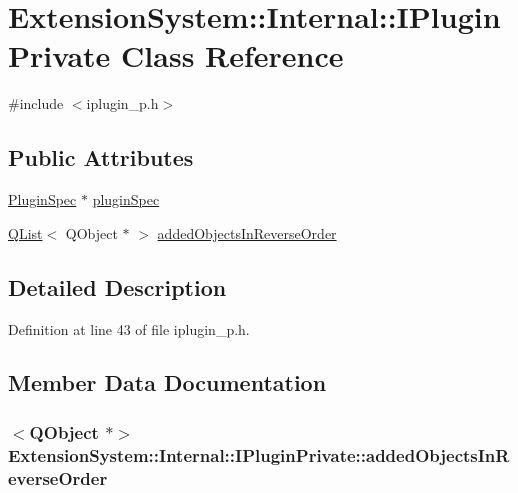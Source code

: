 \hypertarget{class_extension_system_1_1_internal_1_1_i_plugin_private}{\section{Extension\-System\-:\-:Internal\-:\-:I\-Plugin\-Private Class Reference}
\label{class_extension_system_1_1_internal_1_1_i_plugin_private}
}


{\ttfamily \#include $<$iplugin\-\_\-p.\-h$>$}

\subsection*{Public Attributes}
\begin{DoxyCompactItemize}
\item 
\hyperlink{class_extension_system_1_1_plugin_spec}{Plugin\-Spec} $\ast$ \hyperlink{class_extension_system_1_1_internal_1_1_i_plugin_private_a377dc83eb6f39dfa7a57a0530c064d57}{plugin\-Spec}
\item 
\hyperlink{class_q_list}{Q\-List}$<$ Q\-Object $\ast$ $>$ \hyperlink{class_extension_system_1_1_internal_1_1_i_plugin_private_a33f73d57a0b9908d1dfe74e5084c5747}{added\-Objects\-In\-Reverse\-Order}
\end{DoxyCompactItemize}


\subsection{Detailed Description}


Definition at line 43 of file iplugin\-\_\-p.\-h.



\subsection{Member Data Documentation}
\hypertarget{class_extension_system_1_1_internal_1_1_i_plugin_private_a33f73d57a0b9908d1dfe74e5084c5747}{
\subsubsection[{added\-Objects\-In\-Reverse\-Order}]{$<$Q\-Object $\ast$$>$ Extension\-System\-::\-Internal\-::\-I\-Plugin\-Private\-::added\-Objects\-In\-Reverse\-Order}}\label{class_extension_system_1_1_internal_1_1_i_plugin_private_a33f73d57a0b9908d1dfe74e5084c5747}


